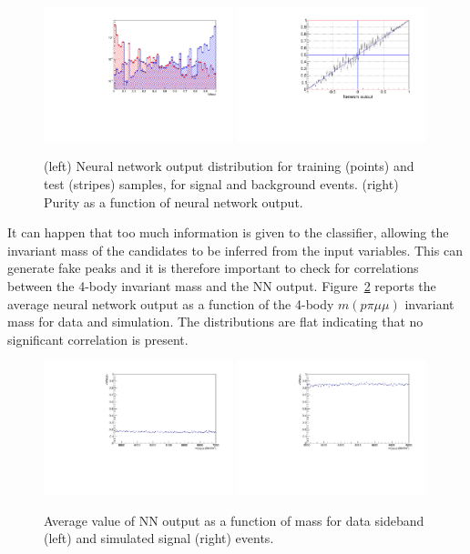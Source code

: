 \begin{figure}
\centering
\includegraphics[width=0.49\textwidth]{Lmumu/figs/TrainAndTest.pdf}
\includegraphics[width=0.49\textwidth]{Lmumu/figs/purity_NN.pdf}
\caption{(left) Neural network output distribution for training (points) and test (stripes) samples,
for signal and background events. (right) Purity as a function of neural network output.}
\label{fig:Lb_nnDist}
\end{figure}
%
It can happen that too much information is given to the classifier, allowing
 the invariant mass of the candidates to be inferred from the input variables.
This can generate fake peaks and it is therefore important to check
for correlations between the 4-body invariant mass and the NN output.
Figure~\ref{fig:Lb_NNprofiles} reports the average neural network output as a function of
the 4-body $m(p\pi\mu\mu)$ invariant mass for data and simulation. The distributions
are flat indicating that no significant correlation is present.
%
\begin{figure}
\centering
\includegraphics[width=0.49\textwidth]{Lmumu/figs/NNout_profile_vs_LbMM_bkgData.pdf}
\includegraphics[width=0.49\textwidth]{Lmumu/figs/NNout_profile_vs_LbMM_MCsignal.pdf}
\caption{Average value of NN output as a function of \Lb mass for data sideband (left) and simulated signal (right) events.}
\label{fig:Lb_NNprofiles}
\end{figure}
